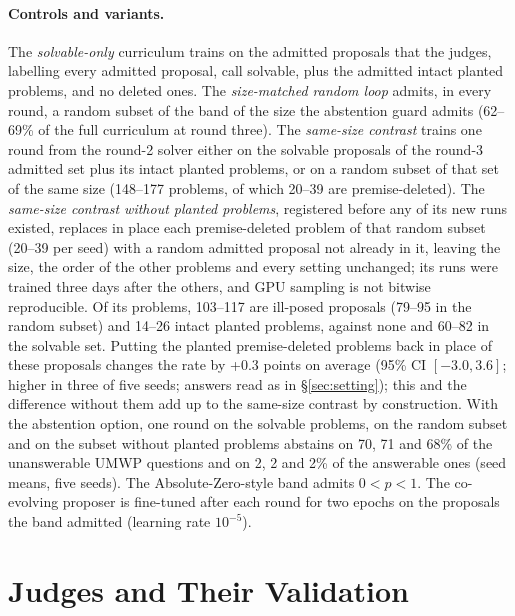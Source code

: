 \paragraph{Controls and variants.} The \emph{solvable-only} curriculum trains on the admitted proposals that the judges, labelling every admitted proposal, call solvable, plus the admitted intact planted problems, and no deleted ones. The \emph{size-matched random loop} admits, in every round, a random subset of the band of the size the abstention guard admits (62--69\% of the full curriculum at round three). The \emph{same-size contrast} trains one round from the round-2 solver either on the solvable proposals of the round-3 admitted set plus its intact planted problems, or on a random subset of that set of the same size (148--177 problems, of which 20--39 are premise-deleted). The \emph{same-size contrast without planted problems}, registered before any of its new runs existed, replaces in place each premise-deleted problem of that random subset (20--39 per seed) with a random admitted proposal not already in it, leaving the size, the order of the other problems and every setting unchanged; its runs were trained three days after the others, and GPU sampling is not bitwise reproducible. Of its problems, 103--117 are ill-posed proposals (79--95 in the random subset) and 14--26 intact planted problems, against none and 60--82 in the solvable set. Putting the planted premise-deleted problems back in place of these proposals changes the rate by +0.3 points on average (95\% CI $[-3.0, 3.6]$; higher in three of five seeds; answers read as in \S\ref{sec:setting}); this and the difference without them add up to the same-size contrast by construction. With the abstention option, one round on the solvable problems, on the random subset and on the subset without planted problems abstains on 70, 71 and 68\% of the unanswerable UMWP questions and on 2, 2 and 2\% of the answerable ones (seed means, five seeds). The Absolute-Zero-style band admits $0 < p < 1$. The co-evolving proposer is fine-tuned after each round for two epochs on the proposals the band admitted (learning rate $10^{-5}$).

\FloatBarrier
\section{Judges and Their Validation}
\label{app:judge}

